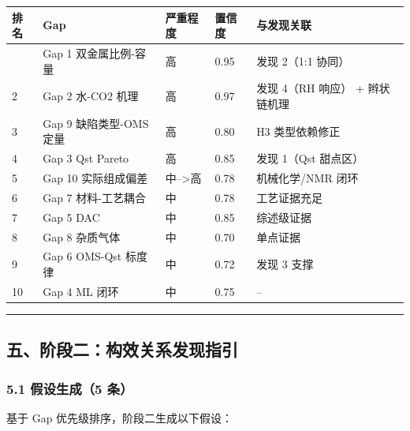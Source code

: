 \documentclass[12pt,a4paper]{ctexart}
\begin{document}
{\def\LTcaptype{none} %
\begin{longtable}[]{@{}lllll@{}}
\toprule\noalign{}
排名 & Gap & 严重程度 & 置信度 & 与发现关联 \\
\midrule\noalign{}
\endhead
\bottomrule\noalign{}
\endlastfoot
1 & Gap 1 双金属比例-容量 & 高 & 0.95 & 发现 2（1:1 协同） \\
2 & Gap 2 水-CO2 机理 & 高 & 0.97 & 发现 4（RH 响应） + 辫状链机理 \\
3 & Gap 9 缺陷类型-OMS 定量 & 高 & 0.80 & H3 类型依赖修正 \\
4 & Gap 3 Qst Pareto & 高 & 0.85 & 发现 1（Qst 甜点区） \\
5 & Gap 10 实际组成偏差 & 中--\textgreater 高 & 0.78 & 机械化学/NMR 闭环 \\
6 & Gap 7 材料-工艺耦合 & 中 & 0.78 & 工艺证据充足 \\
7 & Gap 5 DAC & 中 & 0.85 & 综述级证据 \\
8 & Gap 8 杂质气体 & 中 & 0.70 & 单点证据 \\
9 & Gap 6 OMS-Qst 标度律 & 中 & 0.72 & 发现 3 支撑 \\
10 & Gap 4 ML 闭环 & 中 & 0.75 & -- \\
\end{longtable}
}

\begin{center}\rule{0.5\linewidth}{0.5pt}\end{center}

\subsection{五、阶段二：构效关系发现指引}\label{ux4e94ux9636ux6bb5ux4e8cux6784ux6548ux5173ux7cfbux53d1ux73b0ux6307ux5f15}

\subsubsection{5.1 假设生成（5 条）}\label{ux5047ux8bbeux751fux62105-ux6761}

基于 Gap 优先级排序，阶段二生成以下假设：
\end{document}
